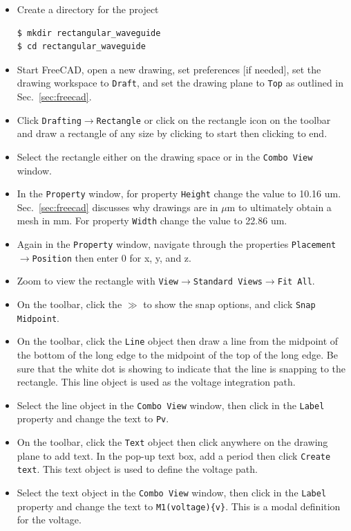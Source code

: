 \documentclass[titlepage]{article}
\renewcommand\_{\textunderscore\linebreak[1]}
\begin{document}
\begin{itemize}
\item Create a directory for the project
\begin{Verbatim}[fontsize=\small]
$ mkdir rectangular_waveguide
$ cd rectangular_waveguide
\end{Verbatim}
\item Start FreeCAD, open a new drawing, set preferences [if needed], set the drawing workspace to \texttt{Draft}, and set the drawing plane to \texttt{Top} as outlined in Sec.~\ref{sec:freecad}.
\item Click \texttt{Drafting}$\rightarrow$\texttt{Rectangle} or click on the rectangle icon on the toolbar and draw a rectangle of any size by clicking to start then clicking to end.
\item Select the rectangle either on the drawing space or in the \texttt{Combo View} window.
\item In the \texttt{Property} window, for property \texttt{Height} change the value to 10.16 um.  Sec.~\ref{sec:freecad} discusses why drawings are in $\mu$m to ultimately obtain a mesh in mm.  For property \texttt{Width} change the value to 22.86 um.
\item Again in the \texttt{Property} window, navigate through the properties \texttt{Placement}$\rightarrow$\texttt{Position} then enter 0 for x, y, and z.
\item Zoom to view the rectangle with \texttt{View}$\rightarrow$\texttt{Standard Views}$\rightarrow$\texttt{Fit All}.
\item On the toolbar, click the $\gg$ to show the snap options, and click \texttt{Snap Midpoint}.
\item On the toolbar, click the \texttt{Line} object then draw a line from the midpoint of the bottom of the long edge to the midpoint of the top of the long edge.  Be sure that the white dot is showing to indicate that the line is snapping to the rectangle.  This line object is used as the voltage integration path.
\item Select the line object in the \texttt{Combo View} window, then click in the \texttt{Label} property and change the text to \texttt{\_Pv}.
\item On the toolbar, click the \texttt{Text} object then click anywhere on the drawing plane to add text.  In the pop-up text box, add a period then click \texttt{Create text}.  This text object is used to define the voltage path.
\item Select the text object in the \texttt{Combo View} window, then click in the \texttt{Label} property and change the text to \texttt{\_M1(voltage)\{v\}}.  This is a modal definition for the voltage.

\end{itemize}
\end{document}
